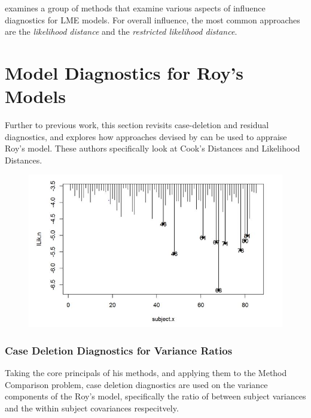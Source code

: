 \documentclass[12pt, a4paper]{report}
\theoremstyle{plain}
\theoremstyle{definition}
\theoremstyle{remark}
\begin{document}
	\citet{west} examines a group of methods that examine various aspects of influence diagnostics for LME models. For overall influence, the most common approaches are the \textit{likelihood distance} and the \textit{restricted likelihood distance}.
	
	
	
	\section{Model Diagnostics for Roy's Models}
	
	Further to previous work, this section revisits case-deletion and residual diagnostics, and explores how approaches devised by  \citet{Galecki} can be used to appraise Roy's model. These authors specifically look at Cook's Distances and Likelihood Distances.
	
	
	
	
	
	\begin{figure}[h!]
		\centering
		\includegraphics[width=0.7\linewidth]{images/LogLik-JS-Roy}
		\caption{}
		\label{fig:LogLik-JS-Roy}
	\end{figure}
	
	
	
	
	
	
	
	
	\subsubsection{Case Deletion Diagnostics for Variance Ratios}
	
	
	Taking the core principals of his methods, and applying them to the Method Comparison problem, case deletion diagnostics are used on the variance components of the Roy's model, specifically the ratio of between subject variances and the within subject covariances respecitvely.
	
\end{document}
